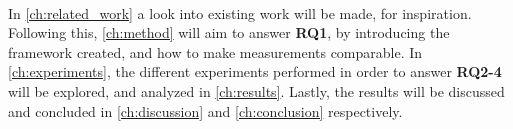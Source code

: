 \paragraph*{}
In \cref{ch:related_work} a look into existing work will be made, for inspiration. Following this, \cref{ch:method} will aim to answer \textbf{RQ1}, by introducing the framework created, and how to make measurements comparable. In \cref{ch:experiments}, the different experiments performed in order to answer \textbf{RQ2-4} will be explored, and analyzed in \cref{ch:results}. Lastly, the results will be discussed and concluded in \cref{ch:discussion} and \cref{ch:conclusion} respectively.








